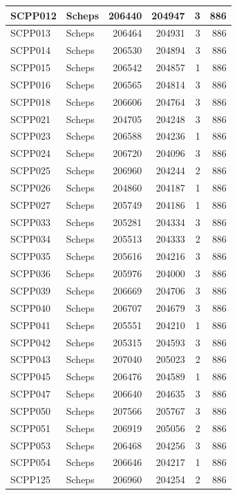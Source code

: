 \documentclass[11pt,]{book}
\begin{document}
\begin{table}
\begin{tabular}[t]{l|l|r|r|r|r}
\hline
SCPP012 & Scheps & 206440 & 204947 & 3 & 886\\
\hline
SCPP013 & Scheps & 206464 & 204931 & 3 & 886\\
\hline
SCPP014 & Scheps & 206530 & 204894 & 3 & 886\\
\hline
SCPP015 & Scheps & 206542 & 204857 & 1 & 886\\
\hline
SCPP016 & Scheps & 206565 & 204814 & 3 & 886\\
\hline
SCPP018 & Scheps & 206606 & 204764 & 3 & 886\\
\hline
SCPP021 & Scheps & 204705 & 204248 & 3 & 886\\
\hline
SCPP023 & Scheps & 206588 & 204236 & 1 & 886\\
\hline
SCPP024 & Scheps & 206720 & 204096 & 3 & 886\\
\hline
SCPP025 & Scheps & 206960 & 204244 & 2 & 886\\
\hline
SCPP026 & Scheps & 204860 & 204187 & 1 & 886\\
\hline
SCPP027 & Scheps & 205749 & 204186 & 1 & 886\\
\hline
SCPP033 & Scheps & 205281 & 204334 & 3 & 886\\
\hline
SCPP034 & Scheps & 205513 & 204333 & 2 & 886\\
\hline
SCPP035 & Scheps & 205616 & 204216 & 3 & 886\\
\hline
SCPP036 & Scheps & 205976 & 204000 & 3 & 886\\
\hline
SCPP039 & Scheps & 206669 & 204706 & 3 & 886\\
\hline
SCPP040 & Scheps & 206707 & 204679 & 3 & 886\\
\hline
SCPP041 & Scheps & 205551 & 204210 & 1 & 886\\
\hline
SCPP042 & Scheps & 205315 & 204593 & 3 & 886\\
\hline
SCPP043 & Scheps & 207040 & 205023 & 2 & 886\\
\hline
SCPP045 & Scheps & 206476 & 204589 & 1 & 886\\
\hline
SCPP047 & Scheps & 206640 & 204635 & 3 & 886\\
\hline
SCPP050 & Scheps & 207566 & 205767 & 3 & 886\\
\hline
SCPP051 & Scheps & 206919 & 205056 & 2 & 886\\
\hline
SCPP053 & Scheps & 206468 & 204256 & 3 & 886\\
\hline
SCPP054 & Scheps & 206646 & 204217 & 1 & 886\\
\hline
SCPP125 & Scheps & 206960 & 204254 & 2 & 886\\

\end{tabular}
\end{table}
\end{document}
